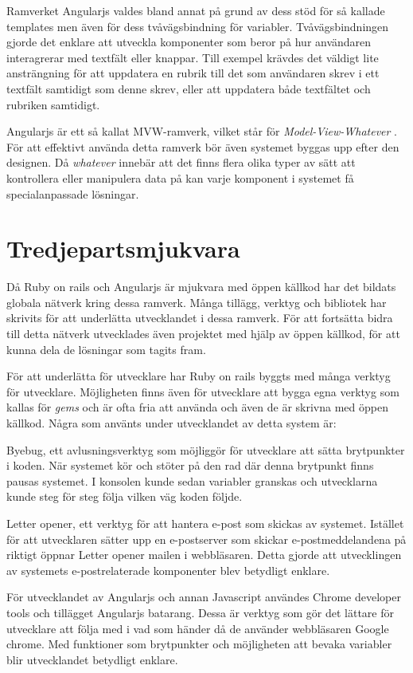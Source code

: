 \documentclass[a4paper,12pt,oneside,final]{extbook}
\begin{document}
Ramverket Angularjs valdes bland annat på grund av dess stöd för så kallade templates men även för dess tvåvägsbindning för variabler. Tvåvägsbindningen gjorde det enklare att utveckla komponenter som beror på hur användaren interagrerar med textfält eller knappar. Till exempel krävdes det väldigt lite ansträngning för att uppdatera en rubrik till det som användaren skrev i ett textfält samtidigt som denne skrev, eller att uppdatera både textfältet och rubriken samtidigt.

Angularjs är ett så kallat MVW-ramverk, vilket står för \textit{Model-View-Whatever} \cite{angularjs}. För att effektivt använda detta ramverk bör även systemet byggas upp efter den designen. Då \textit{whatever} innebär att det finns flera olika typer av sätt att kontrollera eller manipulera data på kan varje komponent i systemet få specialanpassade lösningar. 

\section{Tredjepartsmjukvara}
Då Ruby on rails och Angularjs är mjukvara med öppen källkod har det bildats globala nätverk kring dessa ramverk. Många tillägg, verktyg och bibliotek har skrivits för att underlätta utvecklandet i dessa ramverk. För att fortsätta bidra till detta nätverk utvecklades även projektet med hjälp av öppen källkod, för att kunna dela de lösningar som tagits fram.

För att underlätta för utvecklare har Ruby on rails byggts med många verktyg för utvecklare. Möjligheten finns även för utvecklare att bygga egna verktyg som kallas för \textit{gems} och är ofta fria att använda och även de är skrivna med öppen källkod. Några som använts under utvecklandet av detta system är:

Byebug, ett avlusningsverktyg som möjliggör för utvecklare att sätta brytpunkter i koden. När systemet kör och stöter på den rad där denna brytpunkt finns pausas systemet. I konsolen kunde sedan variabler granskas och utvecklarna kunde steg för steg följa vilken väg koden följde.

Letter opener, ett verktyg för att hantera e-post som skickas av systemet. Istället för att utvecklaren sätter upp en e-postserver som skickar e-postmeddelandena på riktigt öppnar Letter opener mailen i webbläsaren. Detta gjorde att utvecklingen av systemets e-postrelaterade komponenter blev betydligt enklare.

För utvecklandet av Angularjs och annan Javascript användes Chrome developer tools och tillägget Angularjs batarang. Dessa är verktyg som gör det lättare för utvecklare att följa med i vad som händer då de använder webbläsaren Google chrome. Med funktioner som brytpunkter och möjligheten att bevaka variabler blir utvecklandet betydligt enklare.
\end{document}
